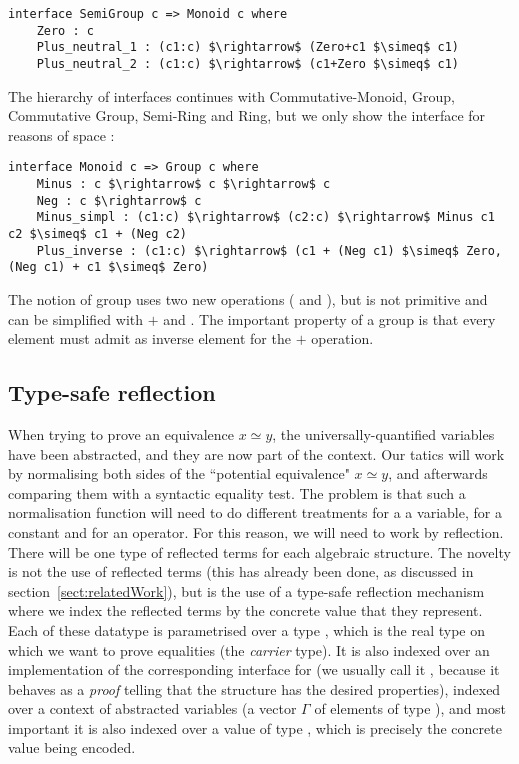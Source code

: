 \begin{lstlisting}
interface SemiGroup c => Monoid c where
    Zero : c    
    Plus_neutral_1 : (c1:c) $\rightarrow$ (Zero+c1 $\simeq$ c1)    
    Plus_neutral_2 : (c1:c) $\rightarrow$ (c1+Zero $\simeq$ c1)
\end{lstlisting}

The hierarchy of interfaces continues with Commutative-Monoid, Group, Commutative Group, Semi-Ring and Ring, but we only show the  interface for reasons of space :

\begin{lstlisting}
interface Monoid c => Group c where
    Minus : c $\rightarrow$ c $\rightarrow$ c
    Neg : c $\rightarrow$ c
    Minus_simpl : (c1:c) $\rightarrow$ (c2:c) $\rightarrow$ Minus c1 c2 $\simeq$ c1 + (Neg c2) 
    Plus_inverse : (c1:c) $\rightarrow$ (c1 + (Neg c1) $\simeq$ Zero, (Neg c1) + c1 $\simeq$ Zero)
\end{lstlisting}

The notion of group uses two new operations ( and ), but  is not primitive and can be simplified with $+$ and . The important property of a group is that every element  must admit  as inverse element for the $+$ operation.

\subsection{Type-safe reflection}
\label{sect:typeSafeReflection}
			
When trying to prove an equivalence $x \simeq y$, the universally-quantified variables have been abstracted, and they are now part of the context. Our tatics will work by normalising both sides of the ``potential equivalence" $x \simeq y$, and afterwards comparing them with a syntactic equality test. The problem is that such a normalisation function will need to do different treatments for a a variable, for a constant and for an operator. For this reason, we will need to work by reflection. There will be one type of reflected terms for each algebraic structure. The novelty is not the use of reflected terms (this has already been done, as discussed in section~\ref{sect:relatedWork}), but is the use of a type-safe reflection mechanism where we index the reflected terms by the concrete value that they represent. Each of these datatype is parametrised over a type , which is the real type on which we want to prove equalities (the \emph{carrier} type). It is also indexed over an implementation of the corresponding interface for  (we usually call it , because it behaves as a \emph{proof} telling that the structure  has the desired properties), indexed over a context of abstracted variables (a vector $\Gamma$ of  elements of type ), and most important it is also indexed over a value of type , which is precisely the concrete value being encoded.

